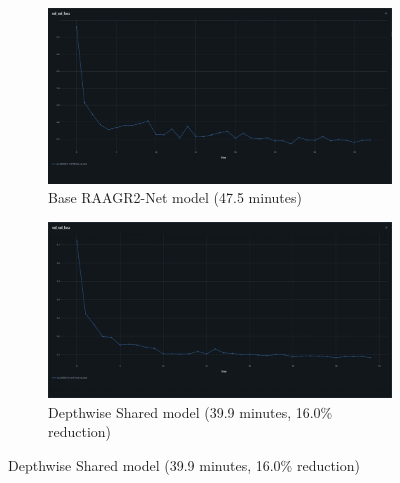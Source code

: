 \documentclass[12pt,a4paper]{article}
\begin{document}
\begin{enumerate}
\begin{figure}[H]
\centering
\begin{subfigure}[t]{0.48\textwidth}
    \centering
    \includegraphics[width=\linewidth]{pictures/intext_image/base_model.png}
    \caption{Base RAAGR2-Net model (47.5 minutes)}
    \label{fig:base_training}
\end{subfigure}
\hfill
\begin{subfigure}[t]{0.48\textwidth}
    \centering
    \includegraphics[width=\linewidth]{pictures/intext_image/depth_wise_shared.png}
    \caption{Depthwise Shared model (39.9 minutes, 16.0\% reduction)}
    \label{fig:depthwise_training}
\end{subfigure}

\vspace{0.5cm}


\end{figure}
\end{enumerate}
\end{document}
